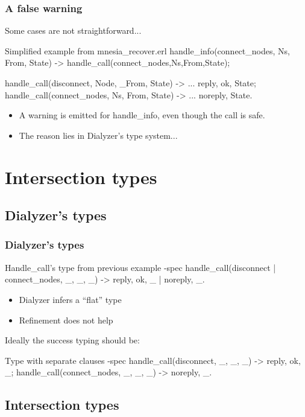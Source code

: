 \documentclass{beamer}
\begin{document}
\begin{frame}[fragile]
  \frametitle{A false warning}
  Some cases are not straightforward...
\begin{code}{Simplified example from mnesia\_recover.erl}
  handle_info({connect_nodes, Ns, From}, State) ->
    handle_call({connect_nodes,Ns},From,State);

  handle_call({disconnect, Node}, _From, State) ->
    ...
    {reply, ok, State};
  handle_call({connect_nodes, Ns}, From, State) ->
    ...
    {noreply, State}.
\end{code}
  \pause
  \begin{itemize}
  \item A warning is emitted for handle\_info, even though the call is
    safe. \pause
  \item The reason lies in Dialyzer's type system...
  \end{itemize}
\end{frame}

\section{Intersection types}

\subsection{Dialyzer's types}

\begin{frame}[fragile]
  \frametitle{Dialyzer's types}
\begin{code}{Handle\_call's type from previous example}
  -spec handle_call({disconnect | connect_nodes, _},
                    _, _) ->
    {reply, ok, _} | {noreply, _}.
\end{code}
  \begin{itemize}
    \item Dialyzer infers a ``flat'' type \pause      
    \item Refinement does not help
  \end{itemize}
  \pause Ideally the success typing should be:
\begin{code}{Type with separate clauses}
  -spec handle_call({disconnect, _}, _, _)
                       -> {reply, ok, _};
        handle_call({connect_nodes, _}, _, _)
                       -> {noreply, _}.
\end{code}
\end{frame}

\subsection{Intersection types}
\end{document}
